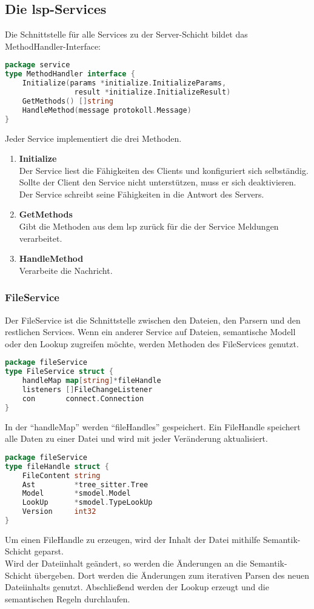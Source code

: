 \documentclass[./einleitung.tex]{subfiles}
\begin{document}
    \subsection{Die \acrshort{lsp}-Services}
    Die Schnittstelle für alle Services zu der Server-Schicht bildet das MethodHandler-Interface:
    \begin{lstlisting}[language=Go]
package service
type MethodHandler interface {
	Initialize(params *initialize.InitializeParams,
                result *initialize.InitializeResult)
	GetMethods() []string
	HandleMethod(message protokoll.Message)
}
    \end{lstlisting}
    Jeder Service implementiert die drei Methoden.
    \begin{enumerate}
        \item \textbf{Initialize} \\
        Der Service liest die Fähigkeiten des Clients und konfiguriert sich selbständig.
        Sollte der Client den Service nicht unterstützen, muss er sich deaktivieren.
        Der Service schreibt seine Fähigkeiten in die Antwort des Servers.
        \item \textbf{GetMethods} \\
        Gibt die Methoden aus dem \acrshort{lsp} zurück für die der Service Meldungen verarbeitet.
        \item \textbf{HandleMethod} \\
        Verarbeite die Nachricht.
    \end{enumerate}


    \subsubsection{FileService}\label{subsubsec:file-service}
    Der FileService ist die Schnittstelle zwischen den Dateien, den Parsern und den restlichen Services.
    Wenn ein anderer Service auf Dateien, semantische Modell oder den Lookup zugreifen möchte, werden Methoden des FileServices genutzt.
    \begin{lstlisting}[language=Go]
package fileService
type FileService struct {
	handleMap map[string]*fileHandle
	listeners []FileChangeListener
	con       connect.Connection
}
    \end{lstlisting}
    In der ``handleMap'' werden ``fileHandles'' gespeichert.
    Ein FileHandle speichert alle Daten zu einer Datei und wird mit jeder Veränderung aktualisiert.
    \begin{lstlisting}[language=Go]
package fileService
type fileHandle struct {
	FileContent string
	Ast         *tree_sitter.Tree
	Model       *smodel.Model
	LookUp      *smodel.TypeLookUp
	Version     int32
}
    \end{lstlisting}
    Um einen FileHandle zu erzeugen, wird der Inhalt der Datei mithilfe Semantik-Schicht geparst.\\
    Wird der Dateiinhalt geändert, so werden die Änderungen an die Semantik-Schicht übergeben.
    Dort werden die Änderungen zum iterativen Parsen des neuen Dateiinhalts genutzt.
    Abschließend werden der Lookup erzeugt und die semantischen Regeln durchlaufen. \\
\end{document}
